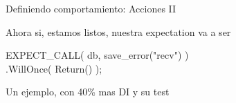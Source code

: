 \begin{frame}[t]{Definiendo comportamiento: Acciones II}
\begin{itemize}
{\begin{itemize}
		\end{itemize}
	}
	 {
		\item Ahora si, estamos listos, nuestra expectation va a ser \\
			\begin{center}
			EXPECT\_CALL( db, save\_error("recv") ) \\
				.WillOnce(\alert{ Return() });
			\end{center}
	}
\end{itemize}
\end{frame}


\begin{frame}[shrink=2]{Un ejemplo, con 40\% mas DI y su test}

\end{frame}

